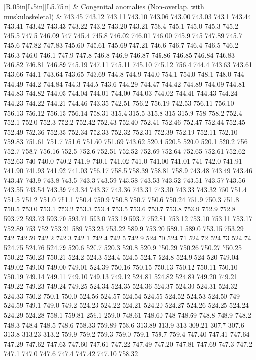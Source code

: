 \begin{longtable}{|R{.05in}|L{.5in}||L{5.75in}|}
    & Congenital  anomalies (Non-overlap. with muskuloskeletal)  &  743.45 743.12 743.11 743.10 743.06 743.00 743.03 743.1 743.44 743.41 743.42 743.43 743.22 743.2 743.20 743.21 758.4 745.1 745.0 745.3 745.2 745.5 747.5 746.09 747 745.4 745.8 746.02 746.01 746.00 745.9 745 747.89 745.7 745.6 747.82 747.83 745.60 745.61 745.69 747.21 746.6 746.7 746.4 746.5 746.2 746.3 746.0 746.1 747.9 747.8 746.8 746.9 746.87 746.86 746.85 746.84 746.83 746.82 746.81 746.89 745.19 747.11 745.11 745.10 745.12 756.4 744.4 743.63 743.61 743.66 744.1 743.64 743.65 743.69 744.8 744.9 744.0 754.1 754.0 748.1 748.0 744 744.49 744.2 744.84 744.3 744.5 743.6 744.29 744.47 744.42 744.89 744.09 744.81 744.83 744.82 744.05 744.04 744.01 744.00 744.03 744.02 744.41 744.43 744.24 744.23 744.22 744.21 744.46 743.35 742.51 756.2 756.19 742.53 756.11 756.10 756.13 756.12 756.15 756.14 758.31 315.4 315.5 315.8 315 315.9 758 758.2 752.4 752.1 752.0 752.3 752.2 752.42 752.43 752.40 752.41 752.46 752.47 752.44 752.45 752.49 752.36 752.35 752.34 752.33 752.32 752.31 752.39 752.19 752.11 752.10 759.83 751.61 751.7 751.6 751.60 751.69 743.62 520.4 520.5 520.0 520.1 520.2 756 752.7 758.7 756.16 752.5 752.6 752.51 752.52 752.69 752.64 752.65 752.61 752.62 752.63 740 740.0 740.2 741.9 740.1 741.02 741.0 741.00 741.01 741 742.0 741.91 741.90 741.93 741.92 741.03 756.17 758.5 758.39 758.81 758.9 743.48 743.49 743.46 743.47 743.9 743.8 743.5 743.3 743.59 743.58 743.53 743.52 743.51 743.57 743.56 743.55 743.54 743.39 743.34 743.37 743.36 743.31 743.30 743.33 743.32 750 751.4 751.5 751.2 751.0 751.1 750.4 750.9 750.8 750.7 750.6 750.24 751.9 750.3 751.8 750.5 753.0 753.1 753.2 753.3 753.4 753.5 753.6 753.7 753.8 753.9 752.9 752.8 593.72 593.73 593.70 593.71 593.0 753.19 593.7 752.81 753.12 753.10 753.11 753.17 752.89 753 752 753.21 589 753.23 753.22 589.9 753.20 589.1 589.0 753.15 753.29 742 742.59 742.2 742.3 742.1 742.4 742.5 742.9 524.70 524.71 524.72 524.73 524.74 524.75 524.76 524.79 520.6 520.7 520.3 520.8 520.9 750.29 750.26 750.27 750.25 750.22 750.23 750.21 524.2 524.3 524.4 524.5 524.7 524.8 524.9 524 520 749.04 749.02 749.03 749.00 749.01 524.39 750.16 750.15 750.13 750.12 750.11 750.10 750.19 749.14 749.11 749.10 749.13 749.12 524.81 524.82 524.89 749.20 749.21 749.22 749.23 749.24 749.25 524.34 524.35 524.36 524.37 524.30 524.31 524.32 524.33 750.2 750.1 750.0 524.56 524.57 524.54 524.55 524.52 524.53 524.50 749 524.59 749.1 749.0 749.2 524.23 524.22 524.21 524.20 524.27 524.26 524.25 524.24 524.29 524.28 758.1 759.81 259.1 259.0 748.61 748.60 748 748.69 748.8 748.9 748.2 748.3 748.4 748.5 748.6 758.33 759.89 758.6 313.89 313.9 313 309.21 307.7 307.6 313.8 313.23 313.2 759.9 759.2 759.3 759.0 759.1 759.7 759.4 747.40 747.41 747.64 747.29 747.62 747.63 747.60 747.61 747.22 747.49 747.20 747.81 747.69 747.3 747.2 747.1 747.0 747.6 747.4 747.42 747.10 758.32\\\hline
\end{longtable}
